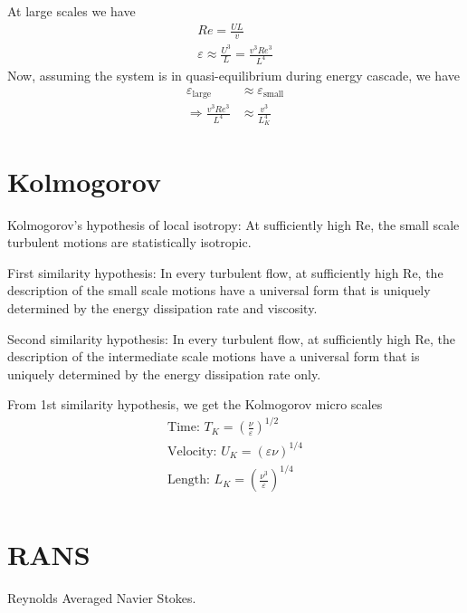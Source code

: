 \documentclass{article}
\let\epsilon\varepsilon
\begin{document}
At large scales we have 
\begin{equation}
	\begin{split}
	Re = \frac{UL}{v}\\
	\epsilon \approx \frac{U^{3}}{L} = \frac{v^{3}Re^{3}}{L^{4}}
	\end{split}
\end{equation}
Now, assuming the system is in quasi-equilibrium during energy cascade, we have
\begin{equation}
	\begin{split}
		\epsilon_{\text{large}}&\approx\epsilon_{\text{small}}\\\Rightarrow
	\frac{v^{3}Re^{3}}{L^{4}}&\approx \frac{v^{3}}{L_{K}^{4}}
	\end{split}
\end{equation}




\section{Kolmogorov}
Kolmogorov’s hypothesis of local isotropy:
At sufficiently high Re, the small scale turbulent motions are statistically isotropic. 

First similarity hypothesis: 
In every turbulent flow, at sufficiently high Re, the description of the small scale motions have a universal form that is uniquely determined by the energy dissipation rate and viscosity. 

Second similarity hypothesis: 
In every turbulent flow, at sufficiently high Re, the description of the intermediate scale motions have a universal form that is uniquely determined by the energy dissipation rate only.

From 1st similarity hypothesis, we get the Kolmogorov micro scales
\begin{equation}
	\begin{split}
		\text{Time: }T_{K} = \left(\frac{\nu}{\epsilon}\right)^{1/2}\\
		\text{Velocity: }U_{K} = \left(\epsilon\nu\right)^{1/4}\\
		\text{Length: }L_{K} = \left(\frac{\nu^{3}}{\epsilon}\right)^{1/4}\\
	\end{split}
\end{equation}




\section{RANS}
Reynolds Averaged Navier Stokes.
\end{document}
